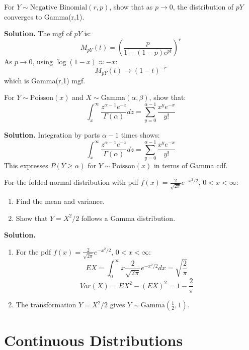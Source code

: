 \begin{problembox}
For \( Y \sim \text{Negative Binomial}(r,p) \), show that as \( p \to 0 \), the distribution of \( pY \) converges to Gamma(r,1).
\end{problembox}

\noindent\textbf{Solution.}
The mgf of \( pY \) is:
\[
M_{pY}(t) = \left(\frac{p}{1-(1-p)e^{pt}}\right)^r
\]
As \( p \to 0 \), using \( \log(1-x) \approx -x \):
\[
M_{pY}(t) \to (1-t)^{-r}
\]
which is Gamma(r,1) mgf.

\begin{problembox}
For \( Y \sim \text{Poisson}(x) \) and \( X \sim \text{Gamma}(\alpha,\beta) \), show that:
\[
\int_x^\infty \frac{z^{\alpha-1}e^{-z}}{\Gamma(\alpha)}dz = \sum_{y=0}^{\alpha-1} \frac{x^y e^{-x}}{y!}
\]
\end{problembox}

\noindent\textbf{Solution.}
Integration by parts \( \alpha-1 \) times shows:
\[
\int_x^\infty \frac{z^{\alpha-1}e^{-z}}{\Gamma(\alpha)}dz = \sum_{y=0}^{\alpha-1} \frac{x^y e^{-x}}{y!}
\]
This expresses \( P(Y \geq \alpha) \) for \( Y \sim \text{Poisson}(x) \) in terms of Gamma cdf.

\begin{problembox}
For the folded normal distribution with pdf \( f(x) = \frac{2}{\sqrt{2\pi}}e^{-x^2/2} \), \( 0<x<\infty \):
\begin{enumerate}[label=(\alph*)]
\item Find the mean and variance.
\item Show that \( Y = X^2/2 \) follows a Gamma distribution.
\end{enumerate}
\end{problembox}

\noindent\textbf{Solution.}
\begin{enumerate}[label=(\alph*)]
\item For the pdf $f(x) = \frac{2}{\sqrt{2\pi}}e^{-x^2/2}$, $0<x<\infty$:
\[
EX = \int_0^\infty x\frac{2}{\sqrt{2\pi}}e^{-x^2/2}dx = \sqrt{\frac{2}{\pi}}
\]
\[
Var(X) = EX^2 - (EX)^2 = 1 - \frac{2}{\pi}
\]

\item The transformation $Y = X^2/2$ gives $Y \sim \text{Gamma}(\frac{1}{2},1)$.
\end{enumerate}

\section{Continuous Distributions}

